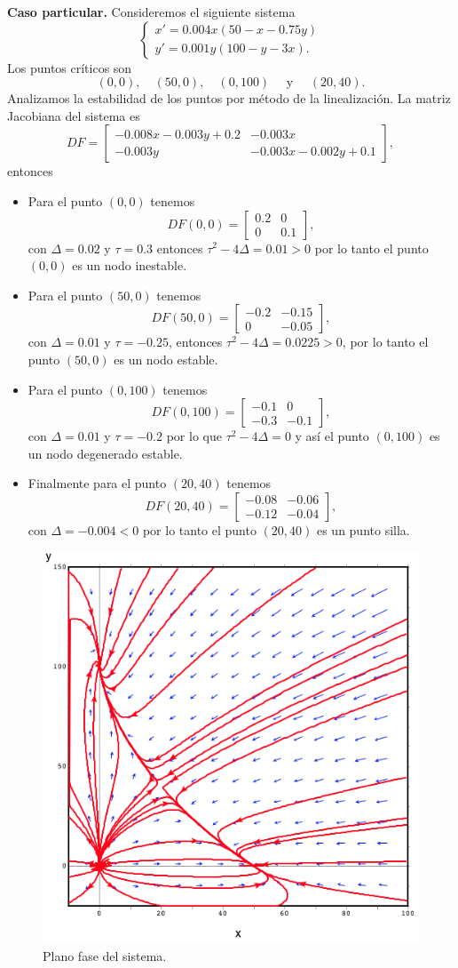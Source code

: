 \documentclass[11pt,letterpaper,draft]{report}
\newcommand\<{\langle}
\renewcommand\>{\rangle}
\begin{document}
\noindent \textbf{Caso particular.} Consideremos el siguiente sistema
\[
\begin{cases}
  x' = 0.004x(50 - x - 0.75y)\\
  y' = 0.001y(100 - y - 3x).
\end{cases}
\] Los puntos críticos son
\[
  (0,0), \quad (50,0), \quad (0,100) \quad \text{ y } \quad (20,40).
\] Analizamos la estabilidad de los puntos por método de la linealización. La matriz Jacobiana del sistema es
\[
  DF = \begin{bmatrix}
    -0.008x - 0.003y + 0.2 & -0.003x\\
    -0.003y & -0.003x - 0.002y + 0.1
  \end{bmatrix},
\] entonces
\begin{itemize}
  \item Para el punto $(0,0)$ tenemos
    \[
      DF(0,0) = \begin{bmatrix}
        0.2 & 0\\
        0 & 0.1
      \end{bmatrix},
    \] con $\Delta = 0.02$ y $\tau = 0.3$ entonces $\tau^2 - 4\Delta = 0.01 > 0$ por lo tanto el punto $(0,0)$ es un nodo inestable.
  \item Para el punto $(50,0)$ tenemos
    \[
      DF(50,0) = \begin{bmatrix}
        -0.2 & -0.15\\
        0 & -0.05
      \end{bmatrix},
    \] con $\Delta = 0.01$ y $\tau = -0.25$, entonces $\tau^2 - 4\Delta = 0.0225 > 0$, por lo tanto el punto $(50,0)$ es un nodo estable.
  \item Para el punto $(0,100)$ tenemos
    \[
      DF(0,100) = \begin{bmatrix}
        -0.1 & 0\\
        -0.3 & -0.1
      \end{bmatrix},
    \] con $\Delta = 0.01$ y $\tau = -0.2$ por lo que $\tau^2 - 4\Delta = 0$ y así el punto $(0,100)$ es un nodo degenerado estable.
  \item Finalmente para el punto $(20,40)$ tenemos
    \[
      DF(20,40) = \begin{bmatrix}
        -0.08 & -0.06\\
        -0.12 & -0.04
      \end{bmatrix},
    \] con $\Delta = -0.004 < 0$  por lo tanto el punto $(20,40)$ es un punto silla.
\end{itemize}

\begin{figure}[h]
  \centering
  \includegraphics[width=0.4\linewidth]{img/lotka-volterra-2.png}
  \caption{Plano fase del sistema.}%
  \label{fig:lotka-volterra-2}
\end{figure}
\end{document}
